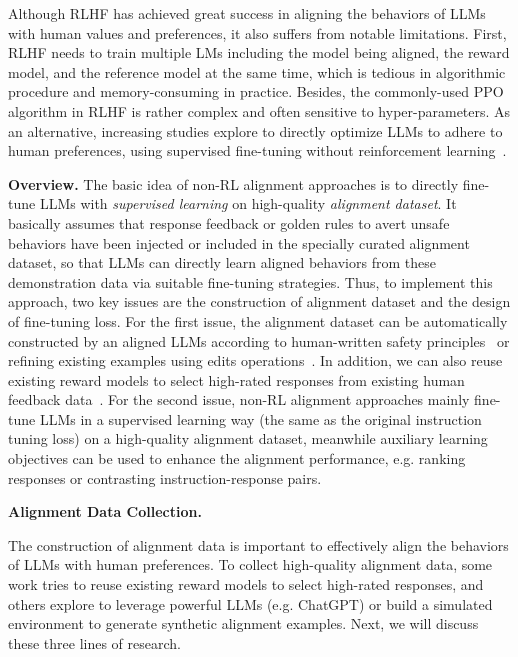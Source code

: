 Although RLHF has achieved great success in aligning the behaviors of LLMs with human values and preferences, it also suffers from notable limitations. First, RLHF needs to train multiple LMs including the model being aligned, the reward model, and the reference model at the same time,  which is  tedious in algorithmic procedure and memory-consuming in practice. Besides, the commonly-used PPO algorithm in RLHF is rather complex and often sensitive to hyper-parameters. As an alternative, increasing studies explore to directly optimize LLMs to adhere to human preferences, using supervised fine-tuning without reinforcement learning~\cite{zhou-arxiv-2023-lima}.

\textbf{Overview.} 
The basic idea of non-RL alignment approaches is to directly fine-tune LLMs with \emph{supervised learning} on high-quality \emph{alignment dataset}. It basically assumes that response feedback or golden rules to avert unsafe behaviors have been injected or included in the specially curated alignment dataset, so that LLMs can directly learn aligned behaviors from these demonstration data via suitable fine-tuning strategies. Thus, to implement this approach, two key issues are the construction of alignment dataset and the design of fine-tuning loss. {For the first issue, the alignment dataset can be automatically constructed by an aligned LLMs according to human-written safety principles~\cite{Sun-arxiv-2023-Principle} or refining existing examples using edits operations~\cite{Liu-NeurIPS-2022-Second}. In addition, we can also reuse existing reward models to select high-rated responses from existing human feedback data~\cite{Dong-RAFT-2023-arxiv}. For the second issue,  non-RL alignment approaches mainly fine-tune  LLMs  in a  supervised learning way (the same as the original instruction tuning loss) on a high-quality alignment dataset, meanwhile auxiliary learning objectives can be used to enhance the  alignment performance, e.g. ranking responses or contrasting instruction-response pairs. } 

\textbf{Alignment Data Collection.} {The construction of alignment data is important to effectively align the behaviors of LLMs with human preferences. To collect high-quality alignment data, some work tries to reuse existing reward models to {select} high-rated  responses,  and others explore to leverage powerful LLMs (e.g. ChatGPT) or build a simulated environment to generate synthetic alignment examples. Next, we will discuss these three lines of research.

}

